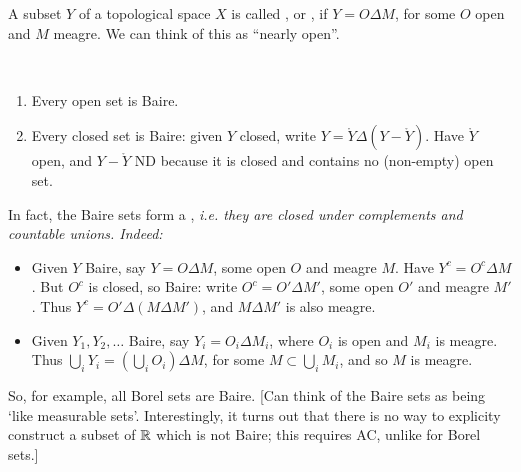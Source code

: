 \documentclass[10pt]{article}
\begin{document}
\begin{defin*}
    A subset $Y$ of a topological space $X$ is called , or , if $Y = O \Delta M$, for some $O$ open and $M$ meagre. We can think of this as ``nearly open''.
\end{defin*}
\begin{remark*}[Examples]\ 
    \begin{enumerate}
        \item Every open set is Baire.
        \item Every closed set is Baire: given $Y$ closed, write $Y = \mathring{Y} \Delta (Y - \mathring{Y})$. Have $\mathring{Y}$ open, and $Y-\mathring{Y}$ ND because it is closed and contains no (non-empty) open set.
    \end{enumerate}
    In fact, the Baire sets form a , \it{i.e.} they are closed under complements and countable unions. Indeed:
    \begin{itemize}
        \item Given $Y$ Baire, say $Y = O\Delta M$, some open $O$ and meagre $M$. Have $Y^c = O^c \Delta M$. But $O^c$ is closed, so Baire: write $O^c = O' \Delta M'$, some open $O'$ and meagre $M'$. Thus $Y^c = O' \Delta (M\Delta M')$, and $M\Delta M'$ is also meagre.
        \item Given $Y_1,Y_2,\dots$ Baire, say $Y_i = O_i \Delta M_i$, where $O_i$ is open and $M_i$ is meagre. Thus $\bigcup_i Y_i = \left(\bigcup_i O_i\right) \Delta M$, for some $M\subset \bigcup_i M_i$, and so $M$ is meagre.
    \end{itemize}
    So, for example, all Borel sets are Baire. [Can think of the Baire sets as being `like measurable sets'. Interestingly, it turns out that there is no way to explicity construct a subset of $\mathbb{R}$ which is not Baire; this requires AC, unlike for Borel sets.]
\end{remark*}
\end{document}

